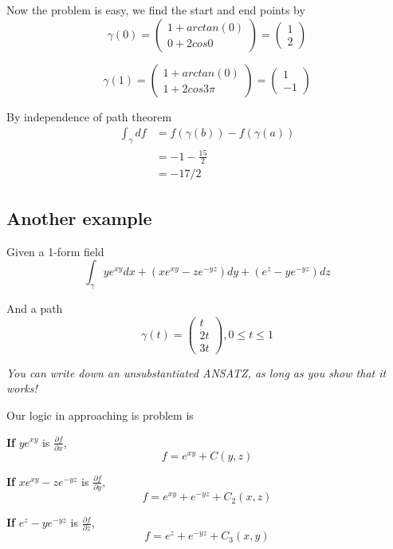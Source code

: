 Now the problem is easy, we find the start and end points by
\[
  \gamma(0) = \begin{pmatrix} 1 + arctan(0) \\ 0 + 2 cos 0 \end{pmatrix}   = \begin{pmatrix} 1 \\2 \end{pmatrix} 
\] 

\[
  \gamma(1) = \begin{pmatrix} 1 + arctan(0) \\ 1 + 2 cos 3 \pi \end{pmatrix}   = \begin{pmatrix} 1 \\-1 \end{pmatrix} 
\] 

By independence of path theorem
\begin{align*}
   \int_{\gamma}^{} df &= f(\gamma(b)) - f(\gamma(a)) \\ 
                       &= -1 - \frac{15}{2}  \\
                       &= - 17 / 2
\end{align*}

\subsection{Another example}

Given a 1-form field
\[
   \int_{\gamma}^{}  y e^{xy} dx + \left( xe^{xy} - ze^{-yz} \right) dy + \left( e^z - ye^{-yz} \right) dz
\] 

And a path
\[
  \gamma(t) = \begin{pmatrix} t \\ 2t \\ 3t \end{pmatrix} , 0 \leq t \leq 1
\] 

\textit{You can write down an unsubstantiated ANSATZ, as long as you show that it works!}

Our logic in approaching is problem is

\textbf{If} $ye^{xy} $ is $ \frac{\partial f}{\partial x}$,
\[
   f = e^{xy} + C(y, z)
\] 

\textbf{If} $ xe^{xy} - z e^{-yz} $ is $ \frac{\partial f}{\partial y}$, 
\[
   f = e^{xy} + e^{-yz} + C_2 \left( x, z \right) 
\] 


\textbf{If} $ e^{z} -  ye^{-yz} $ is $ \frac{\partial f}{\partial z}$, 
\[
   f = e^{z} + e^{-yz} + C_3 \left( x, y \right) 
\] 

